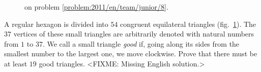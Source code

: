 \ifproblem
\begin{figure}\centering
    \caption{on problem \ref{problem:2011/en/team/junior/8}.}
    \label{fig:problem:2011/en/team/junior/8}
\end{figure}%
\fi %

\problem{}
\label{problem:2011/en/team/junior/8}%
A regular hexagon is divided into $54$ congruent equilateral triangles
(fig.~\ref{fig:problem:2011/en/team/junior/8}).
The $37$ vertices of these small triangles are arbitrarily denoted with natural
numbers from $1$ to $37$.
We call a small triangle \emph{good} if, going along its sides from the
smallest number to the largest one, we move clockwise.
Prove that there must be at least $19$ good triangles.
\solution
<FIXME: Missing English solution.>
\endproblem
